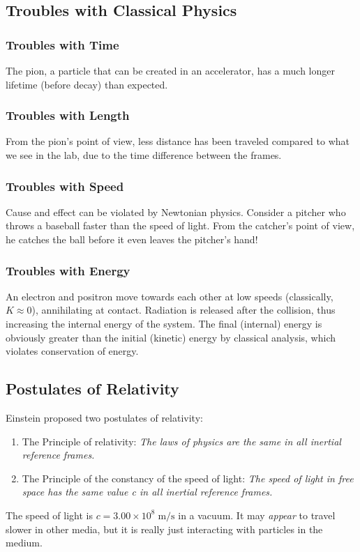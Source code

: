\documentclass[../PhysicsFormulae.tex]{subfiles}
\begin{document}
\subsection{Troubles with Classical Physics}
\subsubsection{Troubles with Time}
The pion, a particle that can be created in an accelerator, has a much longer lifetime (before decay) than expected. 
\subsubsection{Troubles with Length}
From the pion's point of view, less distance has been traveled compared to what we see in the lab, due to the time difference between the frames. 
\subsubsection{Troubles with Speed}
Cause and effect can be violated by Newtonian physics. Consider a pitcher who throws a baseball faster than the speed of light. From the catcher's point of view, he catches the ball before it even leaves the pitcher's hand!
\subsubsection{Troubles with Energy}
An electron and positron move towards each other at low speeds (classically, $K\approx 0$), annihilating at contact. Radiation is released after the collision, thus increasing the internal energy of the system. The final (internal) energy is obviously greater than the initial (kinetic) energy by classical analysis, which violates conservation of energy. 

\subsection{Postulates of Relativity}
Einstein proposed two postulates of relativity:
\begin{enumerate}
    \item The Principle of relativity: \textit{The laws of physics are the same in all inertial reference frames.}
    \item The Principle of the constancy of the speed of light: \textit{The speed of light in free space has the same value c in all inertial reference frames.}
\end{enumerate}
The speed of light is $c = 3.00 \times 10^8 \; \textrm{m/s}$ in a vacuum. It may \textit{appear} to travel slower in other media, but it is really just interacting with particles in the medium.
\end{document}
